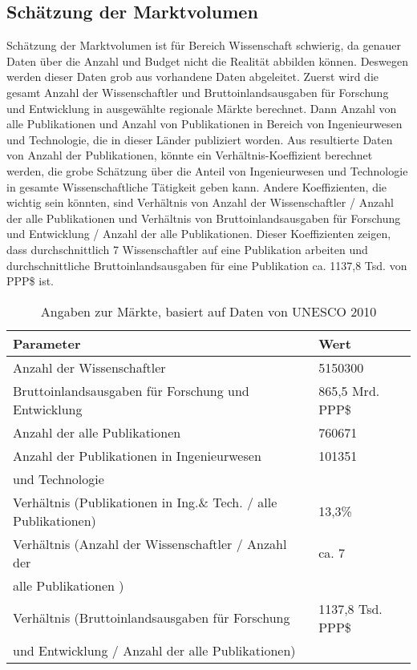 \subsection{Schätzung der Marktvolumen}
Schätzung der Marktvolumen ist für Bereich Wissenschaft schwierig, da genauer Daten über die Anzahl und Budget nicht die Realität abbilden können. Deswegen werden dieser Daten grob aus vorhandene Daten abgeleitet. Zuerst wird die gesamt Anzahl der Wissenschaftler und Bruttoinlandsausgaben für Forschung und Entwicklung in ausgewählte regionale Märkte berechnet. Dann Anzahl von alle Publikationen und Anzahl von Publikationen in Bereich von Ingenieurwesen und Technologie, die in dieser Länder publiziert worden. Aus resultierte Daten von Anzahl der Publikationen, könnte ein Verhältnis-Koeffizient berechnet werden, die grobe Schätzung über die Anteil von Ingenieurwesen und Technologie in gesamte Wissenschaftliche Tätigkeit geben kann. Andere Koeffizienten, die wichtig sein könnten, sind Verhältnis von Anzahl der Wissenschaftler / Anzahl der alle Publikationen und Verhältnis von Bruttoinlandsausgaben für Forschung und Entwicklung / Anzahl der alle Publikationen. Dieser Koeffizienten zeigen, dass durchschnittlich 7 Wissenschaftler auf eine Publikation arbeiten und durchschnittliche Bruttoinlandsausgaben für eine Publikation ca. 1137,8 Tsd. von PPP\$ ist.
\begin{table}[h!]
  \centering
  \begin{tabular}{|l|l|}\hline
   \textbf{Parameter} &  \textbf{Wert} \\ \hline
  Anzahl der Wissenschaftler & 5150300 \\ \hline
  Bruttoinlandsausgaben für Forschung und Entwicklung & 865,5 Mrd. PPP\$ \\ \hline
  Anzahl der alle Publikationen & 760671 \\ \hline
  Anzahl der Publikationen in Ingenieurwesen & 101351
 \\
  und Technologie& \\ \hline
  Verhältnis (Publikationen in Ing.\& Tech. / alle Publikationen) & 13,3\% \\ \hline
  Verhältnis (Anzahl der Wissenschaftler / Anzahl der & ca. 7 \\
  alle Publikationen ) & \\ \hline
  Verhältnis (Bruttoinlandsausgaben für Forschung & 1137,8 Tsd. PPP\$\\
  und Entwicklung / Anzahl der alle Publikationen) & \\ \hline
  \end{tabular}
  \caption{Angaben zur Märkte, basiert auf Daten von UNESCO 2010}
  \label{tab:ABC3}
\end{table}
 

